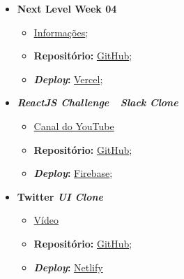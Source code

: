 \begin{minipage}[t]{0.45\textwidth}
	\begin{itemize}
		\item \textbf{Next Level Week 04}
			\begin{itemize}
				\item \href{http://nextlevelweek.com/}{Informações};
				\item \textbf{Repositório:} \href{https://github.com/TutoDS/nlw04-react}{GitHub};
				\item \textbf{\textit{Deploy}:} \href{https://move-it-tutods.vercel.app}{Vercel};
			\end{itemize}

		\item \textbf{\textit{ReactJS Challenge~\textemdash~Slack Clone}}
			\begin{itemize}
				\item \href{https://www.youtube.com/channel/UCqrILQNl5Ed9Dz6CGMyvMTQ}{Canal do YouTube}
				\item \textbf{Repositório:} \href{https://github.com/TutoDS/reactjs-slack-clone-challenge}{GitHub};
				\item \textbf{\textit{Deploy}:} \href{https://slack-clone-challenge-c35ca.web.app/}{Firebase};
			\end{itemize}

			\item \textbf{Twitter \textit{UI Clone}}
			\begin{itemize}
				\item \href{https://www.youtube.com/watch?v=K-8z_4xvT3o}{Vídeo}
				\item \textbf{Repositório:} \href{https://github.com/TutoDS/twitter-ui-clone}{GitHub};
				\item \textbf{\textit{Deploy}:} \href{https://twitter-clone-tutods.netlify.app/}{Netlify}
			\end{itemize}
	\end{itemize}
\end{minipage}

